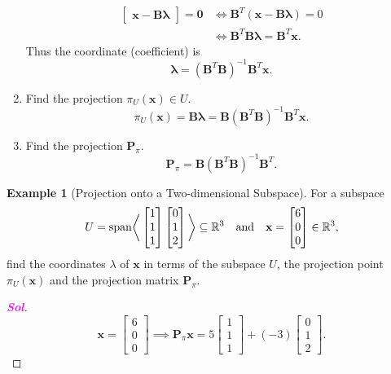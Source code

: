 \documentclass[12pt,openany]{book}
\theoremstyle{definition}
\newtheorem{example}{Example}[chapter]
\newcommand{\R}{\mathbb{R}}
\newcommand{\sol}{\textcolor{magenta}{\bf Sol}}
\renewcommand{\vec}[1]{\textbf{#1}}
\begin{document}
\begin{enumerate}[(Step 1)]
\begin{align*}
\begin{bmatrix}
		\vec{x}-\textbf{B}\boldsymbol{\lambda}
	\end{bmatrix}=\vec{0}&\iff\textbf{B}^T(\vec{x}-\textbf{B}\boldsymbol{\lambda})=0\\
	&\iff\textbf{B}^T\textbf{B}\boldsymbol{\lambda}=\textbf{B}^T\vec{x}.
		\end{align*} Thus the coordinate (coefficient) is\[
		\boldsymbol{\lambda}=(\textbf{B}^T\textbf{B})^{-1}\textbf{B}^T\vec{x}.
		\]
		\item Find the projection \(\pi_U(\vec{x})\in U\). \[
		\pi_U(\vec{x})=\textbf{B}\boldsymbol{\lambda}=\textbf{B}(\textbf{B}^T\textbf{B})^{-1}\textbf{B}^T\vec{x}.
		\]
		\item Find the projection \(\textbf{P}_\pi\). \[
		\textbf{P}_\pi=\textbf{B}(\textbf{B}^T\textbf{B})^{-1}\textbf{B}^T.
		\]
	\end{enumerate}
	\vspace{4pt}
	\begin{example}[Projection onto a Two-dimensional Subspace]
		For a subspace \[U=\textnormal{span}\bigg\langle\begin{bmatrix}
			1\\1\\1
		\end{bmatrix}\begin{bmatrix}
		0\\1\\2
	\end{bmatrix}\bigg\rangle\subseteq\R^3\quad\text{and}\quad\vec{x}=\begin{bmatrix}
	6\\0\\0
\end{bmatrix}\in\R^3,\] find the coordinates \(\lambda\) of \(\vec{x}\) in terms of the subspace \(U\), the projection point \(\pi_U(\vec{x})\) and the projection matrix \(\textbf{P}_\pi\).
	\begin{proof}[\sol]
		\[
		\vec{x}=\begin{bmatrix}
			6\\0\\0
		\end{bmatrix}\implies\textbf{P}_\pi\vec{x}=5\begin{bmatrix}
		1\\1\\1
	\end{bmatrix}+(-3)\begin{bmatrix}
	0\\1\\2
\end{bmatrix}.
		\]
	\end{proof}
	\end{example}
\end{document}
